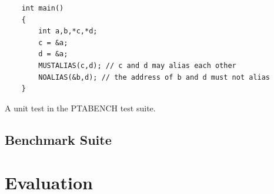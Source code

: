 \begin{listing}
    \begin{verbatim}
    int main()
    {
        int a,b,*c,*d;
        c = &a;
        d = &a;
        MUSTALIAS(c,d); // c and d may alias each other
        NOALIAS(&b,d); // the address of b and d must not alias
    }
        \end{verbatim}
    \caption{A unit test in the PTABENCH test suite.}
    \label{lst:testcase}
\end{listing}

\subsection{Benchmark Suite}
\section{Evaluation}
